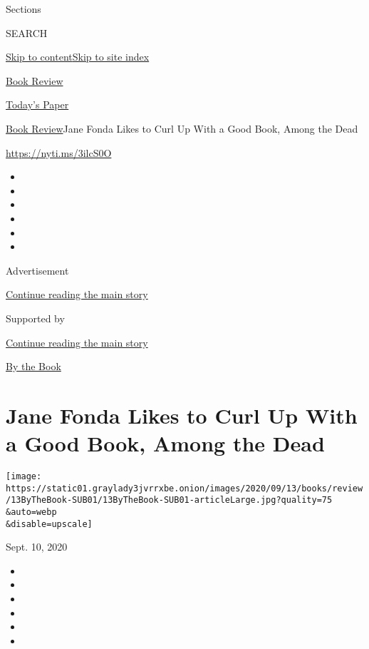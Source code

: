 Sections

SEARCH

\protect\hyperlink{site-content}{Skip to
content}\protect\hyperlink{site-index}{Skip to site index}

\href{https://www.nytimes3xbfgragh.onion/section/books/review}{Book
Review}

\href{https://myaccount.nytimes3xbfgragh.onion/auth/login?response_type=cookie\&client_id=vi}{}

\href{https://www.nytimes3xbfgragh.onion/section/todayspaper}{Today's
Paper}

\href{/section/books/review}{Book Review}\textbar{}Jane Fonda Likes to
Curl Up With a Good Book, Among the Dead

\url{https://nyti.ms/3ilcS0O}

\begin{itemize}
\item
\item
\item
\item
\item
\item
\end{itemize}

Advertisement

\protect\hyperlink{after-top}{Continue reading the main story}

Supported by

\protect\hyperlink{after-sponsor}{Continue reading the main story}

\href{/column/by-the-book}{By the Book}

\hypertarget{jane-fonda-likes-to-curl-up-with-a-good-book-among-the-dead}{%
\section{Jane Fonda Likes to Curl Up With a Good Book, Among the
Dead}\label{jane-fonda-likes-to-curl-up-with-a-good-book-among-the-dead}}

\texttt{[image: https://static01.graylady3jvrrxbe.onion/images/2020/09/13/books/review/13ByTheBook-SUB01/13ByTheBook-SUB01-articleLarge.jpg?quality=75\\\&auto=webp\\\&disable=upscale]}

Sept. 10, 2020

\begin{itemize}
\item
\item
\item
\item
\item
\item
\end{itemize}

